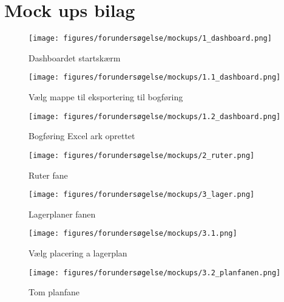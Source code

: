 \chapter{Mock ups bilag}\label{app:mockups}
\begin{figure}
    \centering
    \texttt{[image: figures/forundersøgelse/mockups/1\_dashboard.png]}
    \caption{Dashboardet startskærm}
    \label{fig:1dashboard}
\end{figure}

\begin{figure}
    \centering
    \texttt{[image: figures/forundersøgelse/mockups/1.1\_dashboard.png]}
    \caption{Vælg mappe til eksportering til bogføring}
    \label{fig:11dashboard}
\end{figure}

\begin{figure}
    \centering
    \texttt{[image: figures/forundersøgelse/mockups/1.2\_dashboard.png]}
    \caption{Bogføring Excel ark oprettet}
    \label{fig:12dashboard}
\end{figure}

\begin{figure}
    \centering
    \texttt{[image: figures/forundersøgelse/mockups/2\_ruter.png]}
    \caption{Ruter fane}
    \label{fig:2routes}
\end{figure}

\begin{figure}
    \centering
    \texttt{[image: figures/forundersøgelse/mockups/3\_lager.png]}
    \caption{Lagerplaner fanen}
    \label{fig:3storage}
\end{figure}

\begin{figure}
    \centering
    \texttt{[image: figures/forundersøgelse/mockups/3.1.png]}
    \caption{Vælg placering a lagerplan}
    \label{fig:31storage}
\end{figure}

\begin{figure}
    \centering
    \texttt{[image: figures/forundersøgelse/mockups/3.2\_planfanen.png]}
    \caption{Tom planfane}
    \label{fig:31storage}
\end{figure}
